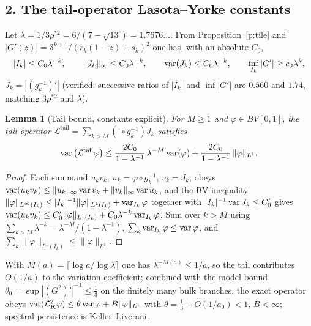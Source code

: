 \documentclass[11pt]{article}
\newtheorem{lemma}{Lemma}\newtheorem{proposition}{Proposition}\newtheorem{theorem}{Theorem}
\theoremstyle{remark}\newtheorem{remark}{Remark}
\newcommand{\Lop}{\mathcal L}\newcommand{\e}{\mathbf e}\newcommand{\D}{\mathcal D}\newcommand{\Leb}{\mathrm{Leb}}
\begin{document}
\subsection*{2. The tail-operator Lasota--Yorke constants}
Let $\lambda=1/3\rho^{\ast2}=6/(7-\sqrt{13})=1.7676\ldots$. From
Proposition~\ref{p:tile} and $|G'(z)|=3^{k+1}/(r_k(1-z)+s_k)^2$ one has, with
an absolute $C_0$,
\[
|I_k|\le C_0\lambda^{-k},\qquad \|J_k\|_\infty\le C_0\lambda^{-k},\qquad
\operatorname{var}(J_k)\le C_0\lambda^{-k},\qquad \inf_{I_k}|G'|\ge c_0\lambda^{k},
\]
$J_k=|(g_k^{-1})'|$ (verified: successive ratios of $|I_k|$ and $\inf|G'|$ are
$0.560$ and $1.74$, matching $3\rho^{\ast2}$ and $\lambda$).
\begin{lemma}[Tail bound, constants explicit]\label{l:tail}
For $M\ge1$ and $\varphi\in BV[0,1]$, the tail operator
$\Lop^{\mathrm{tail}}=\sum_{k>M}(\cdot\circ g_k^{-1})J_k$ satisfies
\[
\var\big(\Lop^{\mathrm{tail}}\varphi\big)\le
\frac{2C_0}{1-\lambda^{-1}}\,\lambda^{-M}\var(\varphi)
+\frac{2C_0}{1-\lambda^{-1}}\,\|\varphi\|_{L^1}.
\]
\end{lemma}
\begin{proof}
Each summand $u_kv_k$, $u_k=\varphi\circ g_k^{-1}$, $v_k=J_k$, obeys
$\operatorname{var}(u_kv_k)\le\|u_k\|_\infty\operatorname{var} v_k+\|v_k\|_\infty\operatorname{var} u_k$, and the BV
inequality $\|\varphi\|_{L^\infty(I_k)}\le|I_k|^{-1}\|\varphi\|_{L^1(I_k)}
+\operatorname{var}_{I_k}\varphi$ together with $|I_k|^{-1}\operatorname{var} J_k\le C_0'$ gives
$\operatorname{var}(u_kv_k)\le C_0'\|\varphi\|_{L^1(I_k)}+C_0\lambda^{-k}\operatorname{var}_{I_k}\varphi$.
Sum over $k>M$ using $\sum_{k>M}\lambda^{-k}=\lambda^{-M}/(1-\lambda^{-1})$,
$\sum_k\operatorname{var}_{I_k}\varphi\le\operatorname{var}\varphi$, and $\sum_k\|\varphi\|_{L^1(I_k)}
\le\|\varphi\|_{L^1}$.
\end{proof}
With $M(a)=\lceil\log a/\log\lambda\rceil$ one has $\lambda^{-M(a)}\le1/a$, so
the tail contributes $O(1/a)$ to the variation coefficient; combined with the
model bound $\theta_0=\sup|(G^2)'|^{-1}\le\tfrac13$ on the finitely many bulk
branches, the exact operator obeys $\var(\Lop_\R^2\varphi)\le\theta\var\varphi
+B\|\varphi\|_{L^1}$ with $\theta=\tfrac13+O(1/a_0)<1$, $B<\infty$; spectral
persistence is Keller--Liverani.
\end{document}
